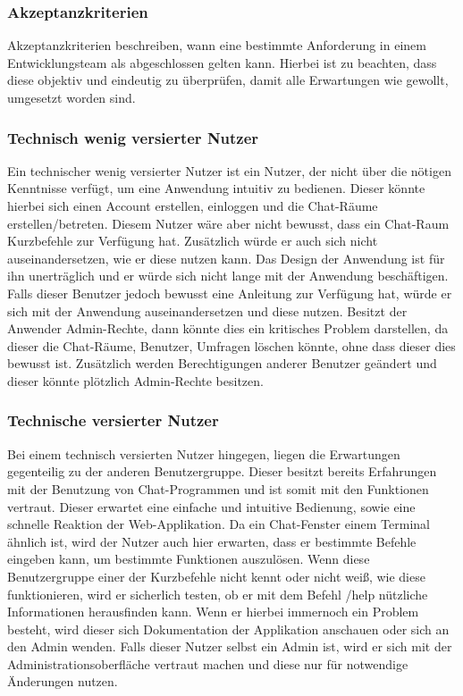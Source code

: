 \subsubsection{Akzeptanzkriterien}
Akzeptanzkriterien beschreiben, wann eine bestimmte Anforderung in einem Entwicklungsteam als abgeschlossen gelten kann. Hierbei ist zu beachten, dass diese objektiv und eindeutig zu überprüfen, damit alle Erwartungen wie gewollt, umgesetzt worden sind. \autocite*{noauthor_akzeptanzkriterien_nodate}
\subsubsection{Technisch wenig versierter Nutzer}
Ein technischer wenig versierter Nutzer ist ein Nutzer, der nicht über die nötigen Kenntnisse verfügt, um eine Anwendung intuitiv zu bedienen. Dieser könnte hierbei sich einen Account erstellen, einloggen und die Chat-Räume erstellen/betreten. Diesem Nutzer wäre aber nicht bewusst, dass ein Chat-Raum Kurzbefehle zur Verfügung hat. Zusätzlich würde er auch sich nicht auseinandersetzen, wie er diese nutzen kann. Das Design der Anwendung ist für ihn unerträglich und er würde sich nicht lange mit der Anwendung beschäftigen. Falls dieser Benutzer jedoch bewusst eine Anleitung zur Verfügung hat, würde er sich mit der Anwendung auseinandersetzen und diese nutzen. Besitzt der Anwender Admin-Rechte, dann könnte dies ein kritisches Problem darstellen, da dieser die Chat-Räume, Benutzer, Umfragen löschen könnte, ohne dass dieser dies bewusst ist. Zusätzlich werden Berechtigungen anderer Benutzer geändert und dieser könnte plötzlich Admin-Rechte besitzen.
\subsubsection{Technische versierter Nutzer}
Bei einem technisch versierten Nutzer hingegen, liegen die Erwartungen gegenteilig zu der anderen Benutzergruppe. Dieser besitzt bereits Erfahrungen mit der Benutzung von Chat-Programmen und ist somit mit den Funktionen vertraut. Dieser erwartet eine einfache und intuitive Bedienung, sowie eine schnelle Reaktion der Web-Applikation. Da ein Chat-Fenster einem Terminal ähnlich ist, wird der Nutzer auch hier erwarten, dass er bestimmte Befehle eingeben kann, um bestimmte Funktionen auszulösen. Wenn diese Benutzergruppe einer der Kurzbefehle nicht kennt oder nicht weiß, wie diese funktionieren, wird er sicherlich testen, ob er mit dem Befehl /help nützliche Informationen herausfinden kann. Wenn er hierbei immernoch ein Problem besteht, wird dieser sich Dokumentation der Applikation anschauen oder sich an den Admin wenden. Falls dieser Nutzer selbst ein Admin ist, wird er sich mit der Administrationsoberfläche vertraut machen und diese nur für notwendige Änderungen nutzen.
\newpage
